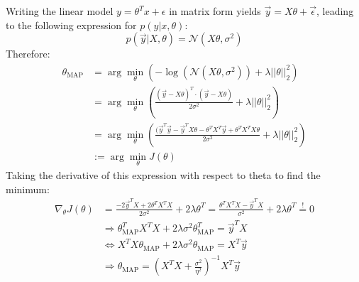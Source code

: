 \begin{answer}
Writing the linear model $y = \theta^Tx + \epsilon$ in matrix form yields $\vec{y} = X\theta + \vec{\epsilon}$, leading to the following expression for $p(y|x,\theta)$:
\begin{equation}
    p(\vec{y}|X,\theta) = \mathcal{N}(X\theta,\sigma^2)
\end{equation}
Therefore:
\begin{align*}
    \theta_{\text{MAP}}  &= \arg\min_\theta (-\log(\mathcal{N}(X\theta,\sigma^2)) + \lambda||\theta||^2_2) \\
                         &= \arg\min_\theta \left(\frac{(\vec{y}-X\theta)^T\cdot(\vec{y}-X\theta)}{2\sigma^2} + \lambda||\theta||^2_2\right) \\
                         &= \arg\min_\theta \left(\frac{(\vec{y}^T\vec{y} - \vec{y}^TX\theta-\theta^TX^T\vec{y}+\theta^TX^TX\theta}{2\sigma^2} + \lambda||\theta||^2_2\right) \\
                         &:= \arg\min_\theta J(\theta)
\end{align*}
Taking the derivative of this expression with respect to theta to find the minimum:
\begin{align*}
    \nabla_\theta J(\theta) &= \frac{-2 \vec{y}^TX + 2\theta^TX^TX}{2\sigma^2} + 2 \lambda\theta^T = \frac{\theta^TX^TX-\vec{y}^TX}{\sigma^2} + 2 \lambda\theta^T \overset{!}{=} 0\\
    &\Rightarrow  \theta_{\text{MAP}}^TX^TX +   2 \lambda\sigma^2\theta_{\text{MAP}}^T = \vec{y}^TX \\
    &\Leftrightarrow  X^TX\theta_{\text{MAP}} +   2 \lambda\sigma^2\theta_{\text{MAP}} = X^T\vec{y} \\
    &\Rightarrow \theta_{\text{MAP}} = \left(X^TX + \frac{\sigma^2}{\eta^2}\right)^{-1}X^T\vec{y}
\end{align*}
\end{answer}
